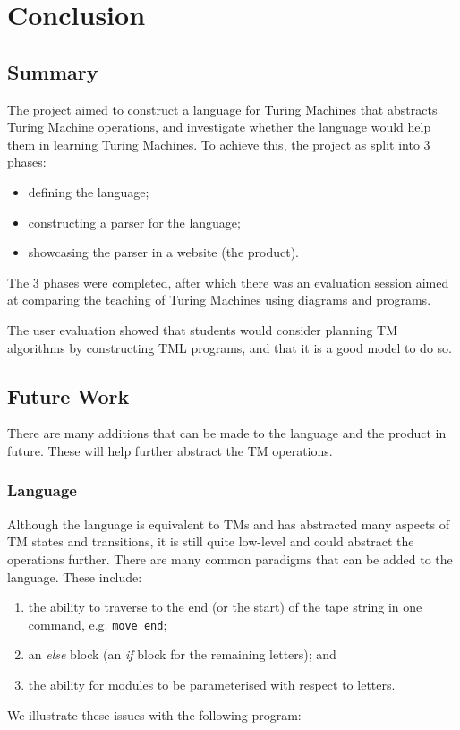 \chapter{Conclusion}

\section{Summary}
The project aimed to construct a language for Turing Machines that abstracts Turing Machine operations, and investigate whether the language would help them in learning Turing Machines. To achieve this, the project as split into 3 phases:
\begin{itemize}
    \item defining the language;
    \item constructing a parser for the language;
    \item showcasing the parser in a website (the product).
\end{itemize}
The 3 phases were completed, after which there was an evaluation session aimed at comparing the teaching of Turing Machines using diagrams and programs.

The user evaluation showed that students would consider planning TM algorithms by constructing TML programs, and that it is a good model to do so. 

\section{Future Work}

There are many additions that can be made to the language and the product in future. These will help further abstract the TM operations.

\subsection{Language}
Although the language is equivalent to TMs and has abstracted many aspects of TM states and transitions, it is still quite low-level and could abstract the operations further. There are many common paradigms that can be added to the language. These include:
\begin{enumerate}
    \item the ability to traverse to the end (or the start) of the tape string in one command, e.g. \texttt{move end}; 
    \item an \textit{else} block (an \textit{if} block for the remaining letters); and
    \item the ability for modules to be parameterised with respect to letters.
\end{enumerate}
We illustrate these issues with the following program:


